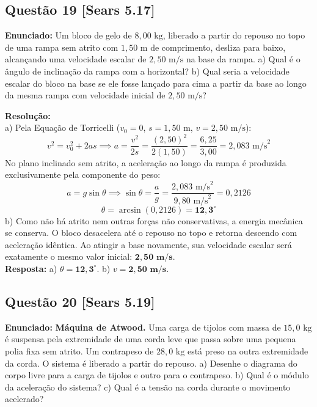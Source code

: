 \documentclass[11pt,a4paper]{article}
\begin{document}
\vspace{0.3cm}
\subsection*{Questão 19 [Sears 5.17]}
\textbf{Enunciado:} Um bloco de gelo de $8,00\text{ kg}$, liberado a partir do repouso no topo de uma rampa sem atrito com $1,50\text{ m}$ de comprimento, desliza para baixo, alcançando uma velocidade escalar de $2,50\text{ m/s}$ na base da rampa. a) Qual é o ângulo de inclinação da rampa com a horizontal? b) Qual seria a velocidade escalar do bloco na base se ele fosse lançado para cima a partir da base ao longo da mesma rampa com velocidade inicial de $2,50\text{ m/s}$?

\noindent
\textbf{Resolução:}\\
a) Pela Equação de Torricelli ($v_0 = 0$, $s = 1,50\text{ m}$, $v = 2,50\text{ m/s}$):
\[ v^2 = v_0^2 + 2 a s \implies a = \frac{v^2}{2 s} = \frac{(2,50)^2}{2(1,50)} = \frac{6,25}{3,00} = 2,083\text{ m/s}^2 \]
No plano inclinado sem atrito, a aceleração ao longo da rampa é produzida exclusivamente pela componente do peso:
\[ a = g \sin\theta \implies \sin\theta = \frac{a}{g} = \frac{2,083\text{ m/s}^2}{9,80\text{ m/s}^2} = 0,2126 \]
\[ \theta = \arcsin(0,2126) = \mathbf{12,3^\circ} \]
b) Como não há atrito nem outras forças não conservativas, a energia mecânica se conserva. O bloco desacelera até o repouso no topo e retorna descendo com aceleração idêntica. Ao atingir a base novamente, sua velocidade escalar será exatamente o mesmo valor inicial: $\mathbf{2,50\text{ m/s}}$.\\
\textbf{Resposta:} a) $\theta = \mathbf{12,3^\circ}$. b) $v = \mathbf{2,50\text{ m/s}}$.

\vspace{0.3cm}
\subsection*{Questão 20 [Sears 5.19]}
\textbf{Enunciado:} \textbf{Máquina de Atwood.} Uma carga de tijolos com massa de $15,0\text{ kg}$ é suspensa pela extremidade de uma corda leve que passa sobre uma pequena polia fixa sem atrito. Um contrapeso de $28,0\text{ kg}$ está preso na outra extremidade da corda. O sistema é liberado a partir do repouso. a) Desenhe o diagrama do corpo livre para a carga de tijolos e outro para o contrapeso. b) Qual é o módulo da aceleração do sistema? c) Qual é a tensão na corda durante o movimento acelerado?
\end{document}
